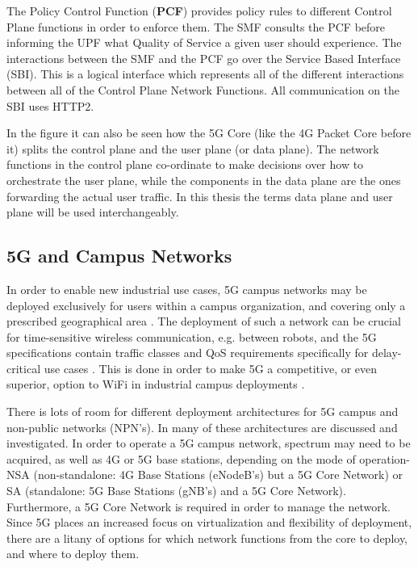 The Policy Control Function (\textbf{PCF}) provides policy rules to different Control Plane functions in order to enforce them. The SMF consults the PCF before informing the UPF what Quality of Service a given user should experience. The interactions between the SMF and the PCF go over the Service Based Interface (SBI). This is a logical interface which represents all of the different interactions between all of the Control Plane Network Functions. All communication on the SBI uses HTTP2.

In the figure it can also be seen how the 5G Core (like the 4G Packet Core before it) splits the control plane and the user plane (or data plane). The network functions in the control plane co-ordinate to make decisions over how to orchestrate the user plane, while the components in the data plane are the ones forwarding the actual user traffic. In this thesis the terms data plane and user plane will be used interchangeably.

\subsection{5G and Campus Networks}

In order to enable new industrial use cases, 5G campus networks may be deployed exclusively for users within a campus organization, and covering only a prescribed geographical area \cite{rischke20215g}. The deployment of such a network can be crucial for time-sensitive wireless communication, e.g. between robots, and the 5G specifications contain traffic classes and QoS requirements specifically for delay-critical use cases \cite{3gpp.23.501}. This is done in order to make 5G a competitive, or even superior, option to WiFi in industrial campus deployments \cite{walia20175g}.

There is lots of room for different deployment architectures for 5G campus and non-public networks (NPN's). In \cite{prados20215g} many of these architectures are discussed and investigated. In order to operate a 5G campus network, spectrum may need to be acquired, as well as 4G or 5G base stations, depending on the mode of operation- NSA (non-standalone: 4G Base Stations (eNodeB's) but a 5G Core Network) or SA (standalone: 5G Base Stations (gNB's) and a 5G Core Network). Furthermore, a 5G Core Network is required in order to manage the network. Since 5G places an increased focus on virtualization and flexibility of deployment, there are a litany of options for which network functions from the core to deploy, and where to deploy them.

